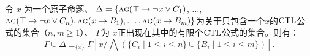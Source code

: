 \begin{lemma} \label{thm:Aclm}
	令 $x$ 为一个原子命题、 
	$\Delta = \{\textsc{a}\textsc{g}(\top \rightarrow \neg x \vee C_1)$, $\dots$, $\textsc{a}\textsc{g}(\top \rightarrow \neg x \vee C_n), \textsc{a}\textsc{g}(x \rightarrow B_1), \dots, \textsc{a}\textsc{g}(x \rightarrow B_m)\}$为关于只包含一个$x$的$\textrm{CTL}$公式的集合（$n, m \geq 1$）、
	$\Gamma$为 $x$正出现在其中的有限个$\textrm{CTL}$公式的集合。则有：
	\begin{equation}\label{eq:Ackermann:lemma}
		\Gamma\cup \Delta \equiv_{\{x\}}  
		\Gamma\left[x/\bigwedge\left(\{C_i\mid 1\le i\le n\}\cup\{B_i\mid 1\le i\le m\}\right)\right].
	\end{equation}
\end{lemma}
